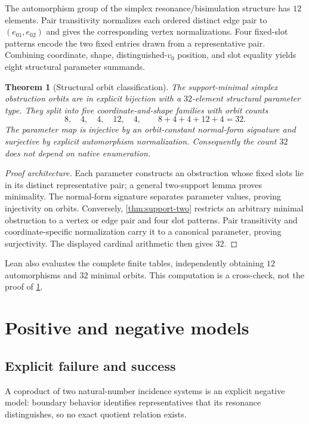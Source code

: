 \documentclass[11pt]{article}
\newtheorem{theorem}{Theorem}[section]
\theoremstyle{definition}
\begin{document}
The automorphism group of the simplex resonance/bisimulation structure has
$12$ elements.  Pair transitivity normalizes each ordered distinct edge pair to
$(e_{01},e_{02})$ and gives the corresponding vertex normalizations.  Four
fixed-slot patterns encode the two fixed entries drawn from a representative
pair.  Combining coordinate, shape, distinguished-$v_0$ position, and slot
equality yields eight structural parameter summands.

\begin{theorem}[Structural orbit classification]\label{thm:32}
The support-minimal simplex obstruction orbits are in explicit bijection with a
$32$-element structural parameter type.  They split into five
coordinate-and-shape families with orbit counts
\[
8,\quad4,\quad4,\quad12,\quad4,
\qquad 8+4+4+12+4=32.
\]
The parameter map is injective by an orbit-constant normal-form signature and
surjective by explicit automorphism normalization.  Consequently the count
$32$ does not depend on native enumeration.
\end{theorem}

\begin{proof}[Proof architecture]
Each parameter constructs an obstruction whose fixed slots lie in its distinct
representative pair; a general two-support lemma proves minimality.  The
normal-form signature separates parameter values, proving injectivity on
orbits.  Conversely, \cref{thm:support-two} restricts an arbitrary minimal
obstruction to a vertex or edge pair and four slot patterns.  Pair transitivity
and coordinate-specific normalization carry it to a canonical parameter,
proving surjectivity.  The displayed cardinal arithmetic then gives $32$.
\end{proof}

Lean also evaluates the complete finite tables, independently obtaining $12$
automorphisms and $32$ minimal orbits.  This computation is a cross-check, not
the proof of \cref{thm:32}.

\section{Positive and negative models}

\subsection{Explicit failure and success}

A coproduct of two natural-number incidence systems is an explicit negative
model: boundary behavior identifies representatives that its resonance
distinguishes, so no exact quotient relation exists.
\end{document}
